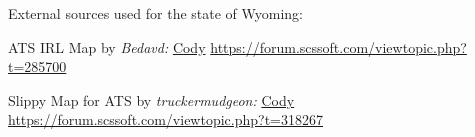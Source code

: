 












\vspace{2em}\footnoterule
{\footnotesize \noindent External sources used for the state of Wyoming:
\begin{description}[
	style=nextline,
	leftmargin=1.1em,
	labelsep=0pt,
	parsep=0pt,
	font=\normalfont,
]

\item[$\ast$]
ATS IRL Map by \textit{Bedavd:}
\hyperref[city:Cody]{Cody}
\url{https://forum.scssoft.com/viewtopic.php?t=285700}

\item[$\dagger$]
Slippy Map for ATS by \textit{truckermudgeon:}
\hyperref[city:Cody]{Cody}
\url{https://forum.scssoft.com/viewtopic.php?t=318267}

\end{description}
}
